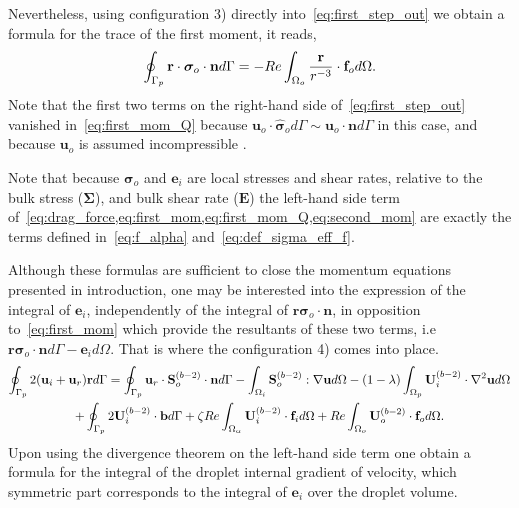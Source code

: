 Nevertheless, using configuration 3) directly into~\ref{eq:first_step_out} we obtain a formula for the trace of the first moment, it reads, 
\begin{equation}
    \intS[p]{\textbf{r} \cdot  \bm\sigma_{o}\cdot \textbf{n}}
    =
    - 
    Re\intO[o]{\frac{\textbf{r}}{r^{-3}}\cdot \textbf{f}_{o}}. 
    \label{eq:first_mom_Q}
\end{equation}
Note that the first two terms on the right-hand side of~\ref{eq:first_step_out} vanished in~\ref{eq:first_mom_Q} because $\textbf{u}_o\cdot \hat{\bm\sigma}_o d\Gamma \sim \textbf{u}_o \cdot \textbf{n}d\Gamma$ in this case, and because $\textbf{u}_o$ is assumed incompressible \citep{stone2001inertial}. 

Note that because $\bm\sigma_o$ and $\textbf{e}_i$ are local stresses and shear rates, relative to the bulk stress ($\bm\Sigma$), and bulk shear rate ($\textbf{E}$) the left-hand side term of~\ref{eq:drag_force,eq:first_mom,eq:first_mom_Q,eq:second_mom} are exactly the terms defined in~\ref{eq:f_alpha} and~\ref{eq:def_sigma_eff_f}. 

Although these formulas are sufficient to close the momentum equations presented in introduction, one may be interested into the expression of the integral of $\textbf{e}_i$, independently of the integral of  $\textbf{r}\bm\sigma_o\cdot \textbf{n}$, in opposition to~\ref{eq:first_mom} which provide the resultants of these two terms, i.e $\textbf{r}\bm\sigma_o\cdot \textbf{n}d\Gamma -\textbf{e}_i d\Omega $. 
That is where the configuration 4) comes into place. 
\begin{multline}
    \intS[p]{2(\textbf{u}_{i} + \textbf{u}_r)\textbf{r}}
    =
    \intS[p]{\textbf{u}_{r}\cdot \textbf{S}_{o}^{(b-2)}\cdot \textbf{n}}
    - \intO[i]{\textbf{S}_{o}^{(b-2)} :\grad\textbf{u}}
    - (1-\lambda) \intO[p]{\textbf{U}_{i}^{(b-2)} \cdot \grad^2 \textbf{u} }\\ 
    + \intS[p]{2\textbf{U}_{i}^{(b-2)} \cdot  \textbf{b}}
    + \zeta Re \intO{\textbf{U}_{i}^{(b-2)}\cdot \textbf{f}_{i}} 
    + Re\intO[o]{\textbf{U}_{o}^{(b-2)}\cdot \textbf{f}_{o}}.
    \label{eq:internal_e}
\end{multline}
Upon using the divergence theorem on the left-hand side term one obtain a formula for the integral of the droplet internal gradient of velocity, which symmetric part corresponds to the integral of $\textbf{e}_i$ over the droplet volume. 


